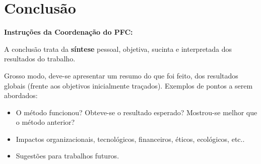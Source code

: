 \chapter{Conclusão}

\textbf{Instruções da Coordenação do PFC:}

A conclusão trata da \textbf{síntese} pessoal, objetiva, sucinta e interpretada dos resultados do trabalho.

Grosso modo, deve-se apresentar um resumo do que foi feito, dos resultados globais (frente aos objetivos inicialmente traçados). Exemplos de pontos a serem abordados:

\begin{itemize}
    \item O método funcionou? Obteve-se o resultado esperado? Mostrou-se melhor que o método anterior?
    \item Impactos organizacionais, tecnológicos, financeiros, éticos, ecológicos, etc..
    \item Sugestões para trabalhos futuros.
\end{itemize}